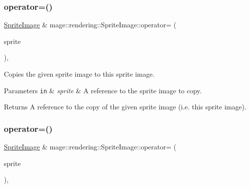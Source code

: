 \subsubsection{\texorpdfstring{operator=()}{operator=()}\hspace{0.1cm}{\footnotesize\ttfamily [1/2]}}
{\footnotesize\ttfamily \mbox{\hyperlink{classmage_1_1rendering_1_1_sprite_image}{Sprite\+Image}} \& mage\+::rendering\+::\+Sprite\+Image\+::operator= (\begin{DoxyParamCaption}\item[{const \mbox{\hyperlink{classmage_1_1rendering_1_1_sprite_image}{Sprite\+Image}} \&}]{sprite }\end{DoxyParamCaption})\hspace{0.3cm}{\ttfamily [default]}, {\ttfamily [noexcept]}}

Copies the given sprite image to this sprite image.


\begin{DoxyParams}[1]{Parameters}
\mbox{\tt in}  & {\em sprite} & A reference to the sprite image to copy. \\
\hline
\end{DoxyParams}
\begin{DoxyReturn}{Returns}
A reference to the copy of the given sprite image (i.\+e. this sprite image). 
\end{DoxyReturn}
\mbox{\label{classmage_1_1rendering_1_1_sprite_image_adabb87110ec41d770061d375cb0db000}} 
\subsubsection{\texorpdfstring{operator=()}{operator=()}\hspace{0.1cm}{\footnotesize\ttfamily [2/2]}}
{\footnotesize\ttfamily \mbox{\hyperlink{classmage_1_1rendering_1_1_sprite_image}{Sprite\+Image}} \& mage\+::rendering\+::\+Sprite\+Image\+::operator= (\begin{DoxyParamCaption}\item[{\mbox{\hyperlink{classmage_1_1rendering_1_1_sprite_image}{Sprite\+Image}} \&\&}]{sprite }\end{DoxyParamCaption})\hspace{0.3cm}{\ttfamily [default]}, {\ttfamily [noexcept]}}


